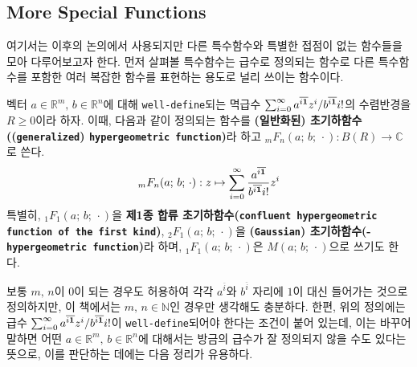 \subsection{More Special Functions}

여기서는 이후의 논의에서 사용되지만 다른 특수함수와 특별한 접점이 없는 함수들을 모아 다루어보고자 한다. 먼저 살펴볼 특수함수는 급수로 정의되는 함수로 다른 특수함수를 포함한 여러 복잡한 함수를 표현하는 용도로 널리 쓰이는 함수이다.

\begin{definition}
    벡터 $a\in\mathbb{R}^m,\,b\in\mathbb{R}^n$에 대해 \texttt{well-define}되는 멱급수 $\sum_{i=0}^\infty a^{\overline{i\mathbf{1}}}z^i/b^{\overline{i\mathbf{1}}}i!$의 수렴반경을 $R\geq0$이라 하자. 이때, 다음과 같이 정의되는 함수를 \textbf{(일반화된) 초기하함수((\texttt{generalized}) \texttt{hypergeometric function})}라 하고 $_mF_n(a;\,b;\,\cdot):B(R)\to\mathbb{C}$로 쓴다.
    \begin{equation*}
        _mF_n(a;\,b;\,\cdot):z\mapsto\sum_{i=0}^\infty\frac{a^{\overline{i\mathbf{1}}}}{b^{\overline{i\mathbf{1}}}i!}z^i
    \end{equation*}
    특별히, $_1F_1(a;\,b;\,\cdot)$을 \textbf{제1종 합류 초기하함수(\texttt{confluent hypergeometric function of the first kind})}, $_2F_1(a;\,b;\,\cdot)$을 \textbf{(\texttt{Gaussian}) 초기하함수(- \texttt{hypergeometric function})}라 하며, $_1F_1(a;\,b;\,\cdot)$은 $M(a;\,b;\,\cdot)$으로 쓰기도 한다.
\end{definition}

보통 $m,\,n$이 $0$이 되는 경우도 허용하여 각각 $a^{\overline{i}}$와 $b^{\overline{i}}$ 자리에 $1$이 대신 들어가는 것으로 정의하지만, 이 책에서는 $m,\,n\in\mathbb{N}$인 경우만 생각해도 충분하다. 한편, 위의 정의에는 급수 $\sum_{i=0}^\infty a^{\overline{i\mathbf{1}}}z^i/b^{\overline{i\mathbf{1}}}i!$이 \texttt{well-define}되어야 한다는 조건이 붙어 있는데, 이는 바꾸어 말하면 어떤 $a\in\mathbb{R}^m,\,b\in\mathbb{R}^n$에 대해서는 방금의 급수가 잘 정의되지 않을 수도 있다는 뜻으로, 이를 판단하는 데에는 다음 정리가 유용하다.

